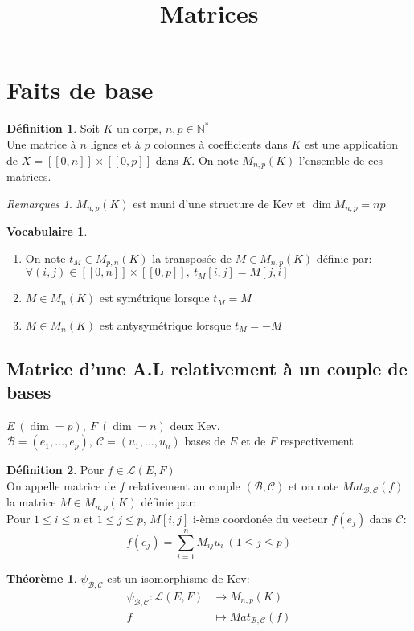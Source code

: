 \documentclass[fleqn]{article}
\title{Matrices}
\date{}
\theoremstyle{definition} \newtheorem*{defi}{D\'efinition}
\theoremstyle{definition} \newtheorem*{theo}{Th\'eor\`eme}
\theoremstyle{definition} \newtheorem*{coro}{Corollaire}
\theoremstyle{definition} \newtheorem*{nota}{Notation}
\theoremstyle{definition} \newtheorem*{vocab}{Vocabulaire}
\theoremstyle{remark} \newtheorem*{rqs}{Remarques}
\theoremstyle{definition} \newtheorem*{prop}{Propri\'et\'e}
\begin{document}
\maketitle

\section{Faits de base}
\begin{defi} Soit $K$ un corps, $n,p \in \mathbb{N}^*$\\
	Une matrice \`a $n$ lignes et \`a $p$ colonnes \`a coefficients dans $K$ est une application de $X = [\![0,n]\!]\times[\![0,p]\!]$ dans
	$K$. On note $M_{n,p}(K)$ l'ensemble de ces matrices.

	\begin{rqs} $M_{n,p}(K)$ est muni d'une structure de Kev et $\dim M_{n,p} = np$
	\end{rqs}
\end{defi}

\begin{vocab} $ $
	\begin{enumerate}
		\item On note $t_M \in M_{p,n}(K)$ la transpos\'ee de $M \in M_{n,p}(K)$ d\'efinie par: $\forall (i,j) \in
		[\![0,n]\!]\times[\![0,p]\!],\ t_M[i,j] = M[j,i]$
		\item $M \in M_n(K)$ est sym\'etrique lorsque $t_M = M$
		\item $M \in M_n(K)$ est antysym\'etrique lorsque $t_M = -M$
	\end{enumerate}
\end{vocab}

\subsection{Matrice d'une A.L relativement à un couple de bases}
$E\ (\dim = p),\ F\ (\dim = n)$ deux Kev.\\ $\mathscr{B} = (e_1, \hdots, e_p),\ \mathscr{C} = (u_1, \hdots, u_n)$ bases de $E$ et
de $F$ respectivement
\begin{defi} Pour $f \in \mathscr{L}(E,F)$\\
	On appelle matrice de $f$ relativement au couple $(\mathscr{B},\mathscr{C})$ et on note $Mat_{\mathscr{B},\mathscr{C}}(f)$ la matrice
	$M \in M_{n,p}(K)$ d\'efinie par:\\ Pour $1 \leq i \leq n$ et $1 \leq j \leq p$, $M[i,j]$ i-\`eme coordon\'ee du vecteur $f(e_j)$ dans
	$\mathscr{C}$: \\
	\[f(e_j) = \sum_{i=1}^n M_{ij} u_i\ (1\leq j \leq p)\]

\begin{theo} $\psi_{\mathscr{B},\mathscr{C}}$ est un isomorphisme de Kev:
	\begin{align*}
		\psi_{\mathscr{B},\mathscr{C}}: \mathscr{L}(E,F) &\rightarrow M_{n,p}(K)\\
		f & \mapsto Mat_{\mathscr{B},\mathscr{C}}(f)
	\end{align*}
\end{theo}
\end{defi}
\end{document}
